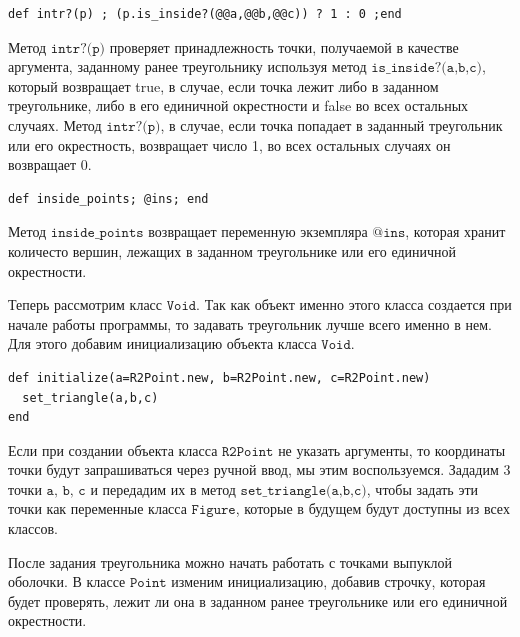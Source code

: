 \begin{small}
\begin{verbatim}
def intr?(p) ; (p.is_inside?(@@a,@@b,@@c)) ? 1 : 0 ;end
\end{verbatim}
\end{small}

Метод $\texttt{intr?(p)}$ проверяет принадлежность точки, получаемой в качестве аргумента, заданному ранее треугольнику используя метод $\texttt{is\_inside?(a,b,c)}$, который возвращает true, в случае, если точка лежит 
либо в заданном треугольнике, либо в его единичной окрестности и false во всех остальных случаях. Метод  $\texttt{intr?(p)}$, в случае, если точка попадает в заданный треугольник или его окрестность, возвращает число 1, во всех остальных
случаях он возвращает 0.


\begin{small}
\begin{verbatim}
def inside_points; @ins; end 
\end{verbatim}
\end{small}

Метод $\texttt{inside\_points}$ возвращает переменную экземпляра  $\texttt{@ins}$, которая хранит количесто вершин, лежащих в заданном треугольнике или его единичной окрестности.

Теперь рассмотрим класс  $\texttt{Void}$. Так как объект именно этого класса создается при начале работы программы, то 
задавать треугольник лучше всего именно в нем. Для этого добавим инициализацию объекта класса $\texttt{Void}$.

\begin{small}
\begin{verbatim}
def initialize(a=R2Point.new, b=R2Point.new, c=R2Point.new)
  set_triangle(a,b,c)
end
\end{verbatim}
\end{small}

Если при создании объекта класса $\texttt{R2Point}$ не указать аргументы, то координаты точки будут запрашиваться
через ручной ввод, мы этим воспользуемся. Зададим 3 точки $\texttt{a, b, c}$ и передадим их в метод $\texttt{set\_triangle(a,b,c)}$, чтобы задать эти точки как переменные класса $\texttt{Figure}$, которые в будущем будут
доступны из всех классов.

После задания треугольника можно начать работать с точками выпуклой оболочки. В классе $\texttt{Point}$ изменим 
инициализацию, добавив строчку, которая будет проверять, лежит ли она в заданном ранее треугольнике или его единичной окрестности.

